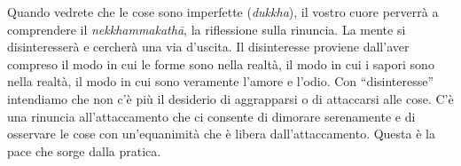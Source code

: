 Quando vedrete che le cose sono imperfette (\emph{dukkha}), il vostro
cuore perverrà a comprendere il \emph{nekkhammakathā}, la riflessione
sulla rinuncia. La mente si disinteresserà e cercherà una via d'uscita.
Il disinteresse proviene dall'aver compreso il modo in cui le forme sono
nella realtà, il modo in cui i sapori sono nella realtà, il modo in cui
sono veramente l'amore e l'odio. Con ``disinteresse'' intendiamo che non
c'è più il desiderio di aggrapparsi o di attaccarsi alle cose. C'è una
rinuncia all'attaccamento che ci consente di dimorare serenamente e di
osservare le cose con un'equanimità che è libera dall'attaccamento.
Questa è la pace che sorge dalla pratica.

